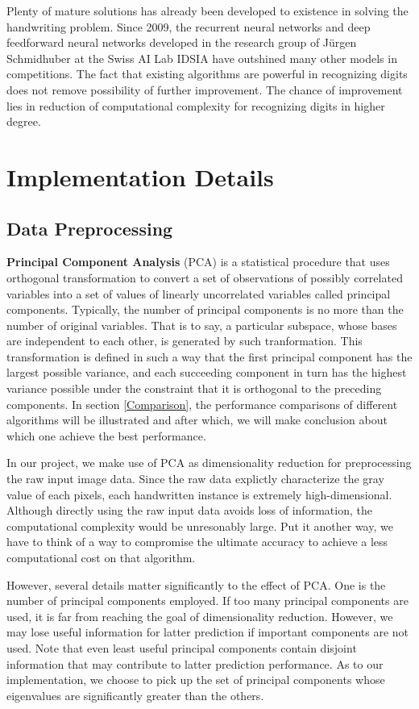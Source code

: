 \documentclass{article} %
\begin{document}
Plenty of mature solutions has already been developed to existence in solving
the handwriting problem. 
Since 2009, the recurrent neural networks and deep feedforward neural networks
developed in the research group of Jürgen Schmidhuber at the Swiss AI Lab
IDSIA have outshined many other models in competitions.
The fact that existing algorithms are powerful in recognizing digits does not
remove possibility of further improvement. The chance of improvement lies in
reduction of computational complexity for recognizing digits in higher degree.

\section{Implementation Details} \label{Details}
\subsection{Data Preprocessing} 
{\bf Principal Component Analysis} (PCA) is a statistical procedure that uses
orthogonal transformation to convert a set of observations of possibly
correlated variables into a set of values of linearly uncorrelated variables
called principal components. Typically, the number of principal components is
no more than the number of original variables. That is to say, a particular
subspace, whose bases are independent to each other, is generated by such
tranformation. This transformation is defined in such a way that the first
principal component has the largest possible variance, and each succeeding
component in turn has the highest variance possible under the constraint that
it is orthogonal to the preceding components. In section \ref{Comparison}, the
performance comparisons of different algorithms will be illustrated and after
which, we will make conclusion about which one achieve the best performance. 

In our project, we make use of PCA as dimensionality reduction for preprocessing the raw input image data.
Since the raw data explictly characterize the gray value of each pixels, each
handwritten instance is extremely high-dimensional. Although directly using
the raw input data avoids loss of information, the computational complexity
would be unresonably large. Put it another way, we have to think of a way to
compromise the ultimate accuracy to achieve a less computational cost on that
algorithm.

However, several details matter significantly to the effect of PCA. One is the number
of principal components employed. If too many principal components are used,
it is far from reaching the goal of dimensionality reduction. However, we may
lose useful information for latter prediction if important components are not
used. Note that even least useful principal components contain disjoint information
that may contribute to latter prediction performance. As to our
implementation, we choose to pick up the set of principal components whose
eigenvalues are significantly greater than the others. 
\end{document}
